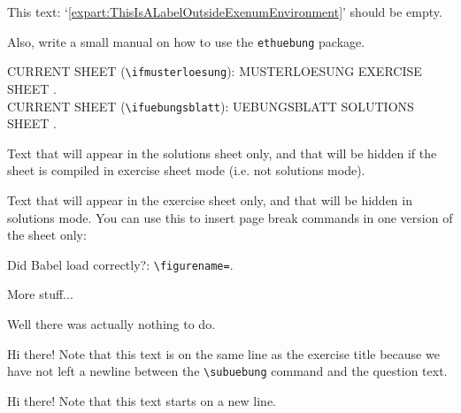 \documentclass[11pt,a4paper]{article}
\begin{document}
This text: `\ref{expart:ThisIsALabelOutsideExenumEnvironment}' should be empty.



\begin{exenumerate}
\item Also, write a small manual on how to use the \texttt{ethuebung} package.
\end{exenumerate}



CURRENT SHEET (\texttt{\textbackslash ifmusterloesung}):
\ifmusterloesung MUSTERLOESUNG \else EXERCISE SHEET \fi .\\
CURRENT SHEET (\texttt{\textbackslash ifuebungsblatt}):
\ifuebungsblatt UEBUNGSBLATT \else SOLUTIONS SHEET \fi .

\begin{onlysolutions} %
Text that will appear in the solutions sheet only, and that will be hidden if the sheet is
compiled in exercise sheet mode (i.e. not solutions mode).
\end{onlysolutions}
\begin{onlyuebungsblatt} %
Text that will appear in the exercise sheet only, and that will be hidden in solutions
mode. You can use this to insert page break commands in one version of the sheet only:

\newpage
\end{onlyuebungsblatt}

Did Babel load correctly?: \texttt{\textbackslash figurename=}\figurename.




More stuff...

\begin{solution}
  Well there was actually nothing to do.
\end{solution}


Hi there! Note that this text is on the same line as the exercise title because we have
not left a newline between the \texttt{\textbackslash subuebung} command and the question
text.


Hi there! Note that this text starts on a new line.
\end{document}
